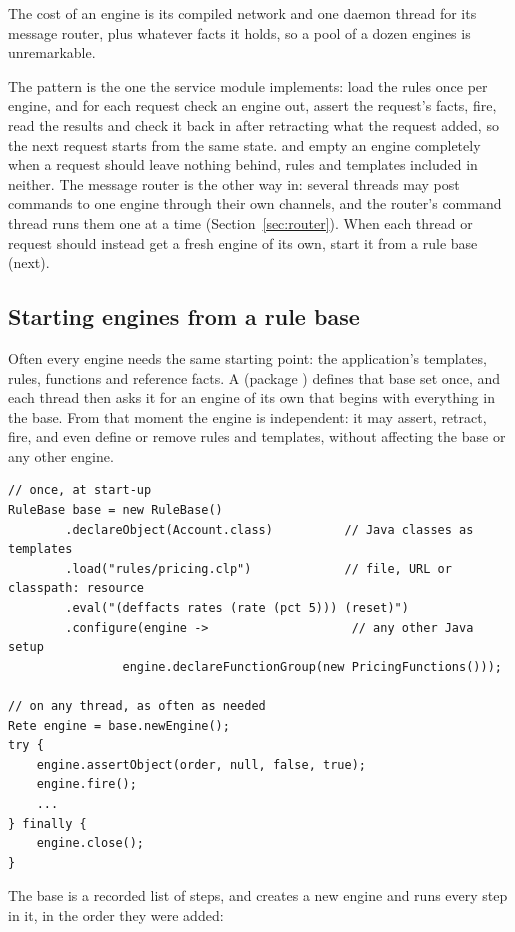 The cost of an engine is its compiled network and one
daemon thread for its message router, plus whatever facts it holds, so
a pool of a dozen engines is unremarkable.

The pattern is the one the service module implements: load the rules
once per engine, and for each request check an engine out, assert the
request's facts, fire, read the results and check it back in after
retracting what the request added, so the next request starts from the
same state.  and  empty an
engine completely when a request should leave nothing behind, rules
and templates included in neither. The message router is the other way
in: several threads may post commands to one engine through their own
channels, and the router's command thread runs them one at a time
(Section~\ref{sec:router}). When each thread or request should instead
get a fresh engine of its own, start it from a rule base (next).

\subsection{Starting engines from a rule base}
\label{sec:rulebase}

Often every engine needs the same starting point: the application's
templates, rules, functions and reference facts. A 
(package ) defines that base set once, and each
thread then asks it for an engine of its own that begins with
everything in the base. From that moment the engine is independent: it
may assert, retract, fire, and even define or remove rules and
templates, without affecting the base or any other engine.

\begin{lstlisting}[style=java]
// once, at start-up
RuleBase base = new RuleBase()
        .declareObject(Account.class)          // Java classes as templates
        .load("rules/pricing.clp")             // file, URL or classpath: resource
        .eval("(deffacts rates (rate (pct 5))) (reset)")
        .configure(engine ->                    // any other Java setup
                engine.declareFunctionGroup(new PricingFunctions()));

// on any thread, as often as needed
Rete engine = base.newEngine();
try {
    engine.assertObject(order, null, false, true);
    engine.fire();
    ...
} finally {
    engine.close();
}
\end{lstlisting}

The base is a recorded list of steps, and  creates a
new engine and runs every step in it, in the order they were added:

